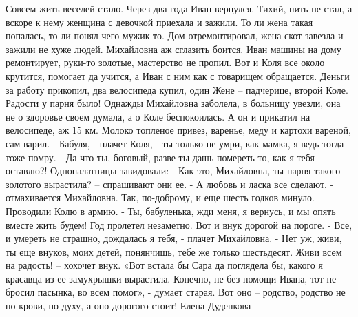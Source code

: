 Совсем жить веселей стало. Через два года Иван вернулся. Тихий, пить не стал, а вскоре к нему женщина с девочкой приехала и зажили. То ли жена такая попалась, то ли понял чего мужик-то. Дом отремонтировал, жена скот завезла и зажили не хуже людей. Михайловна аж сглазить боится. Иван машины на дому ремонтирует, руки-то золотые, мастерство не пропил. Вот и Коля все около крутится, помогает да учится, а Иван с ним как с товарищем обращается. Деньги за работу прикопил, два велосипеда купил, один Жене – падчерице, второй Коле. Радости у парня было!
Однажды Михайловна заболела, в больницу увезли, она не о здоровье своем думала, а о Коле беспокоилась. А он и прикатил на велосипеде, аж 15 км. Молоко топленое привез, варенье, меду и картохи вареной, сам варил.
- Бабуля, - плачет Коля, - ты только не умри, как мамка, я ведь тогда тоже помру.
- Да что ты, боговый, разве ты дашь помереть-то, как я тебя оставлю?!
Однопалатницы завидовали:
- Как это, Михайловна, ты парня такого золотого вырастила? – спрашивают они ее.
- А любовь и ласка все сделают, - отмахивается Михайловна.
Так, по-доброму, и еще шесть годков минуло. Проводили Колю в армию.
- Ты, бабуленька, жди меня, я вернусь, и мы опять вместе жить будем!
Год пролетел незаметно. Вот и внук дорогой на пороге.
- Все, и умереть не страшно, дождалась я тебя, - плачет Михайловна.
- Нет уж, живи, ты еще внуков, моих детей, понянчишь, тебе же только шестьдесят. Живи всем на радость! – хохочет внук.
«Вот встала бы Сара да поглядела бы, какого я красавца из ее замухрышки вырастила. Конечно, не без помощи Ивана, тот не бросил пасынка, во всем помог», - думает старая.
Вот оно – родство, родство не по крови, по духу, а оно дорогого стоит!
Елена Дуденкова
